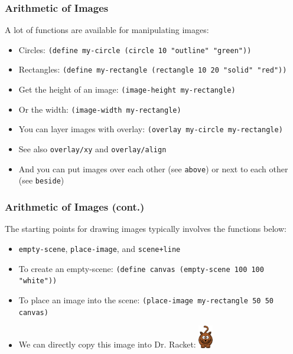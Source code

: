 \documentclass{beamer}
\begin{document}
\begin{frame}
  \frametitle{Arithmetic of Images}
  A lot of functions are available for manipulating images:
  \begin{itemize}
  \item<2-> Circles: \texttt{(define my-circle (circle 10 "outline" "green"))}
  \item<3-> Rectangles: \texttt{(define my-rectangle (rectangle 10 20 "solid" "red"))}
  \item<4-> Get the height of an image: \texttt{(image-height my-rectangle)}
  \item<5-> Or the width: \texttt{(image-width my-rectangle)}
  \item<6-> You can layer images with overlay: \texttt{(overlay my-circle my-rectangle)}
  \item<7-> See also \texttt{overlay/xy} and \texttt{overlay/align}
  \item<8-> And you can put images over each other (see \texttt{above})
    or next to each other (see \texttt{beside})
  \end{itemize}
\end{frame}

\begin{frame}
  \frametitle{Arithmetic of Images (cont.)}
  The starting points for drawing images typically involves the functions below:
  \begin{itemize}
  \item<2-> \texttt{empty-scene}, \texttt{place-image},
    and \texttt{scene+line}
  \item<3-> To create an empty-scene:
    \texttt{(define canvas (empty-scene 100 100 "white"))}
  \item<4-> To place an image into the scene:
    \texttt{(place-image my-rectangle 50 50 canvas)}  
  \item<5-> We can directly copy this image into Dr. Racket: \includegraphics[width=0.05\textwidth]{images/cat.png}    
  \end{itemize}
\end{frame}
\end{document}
